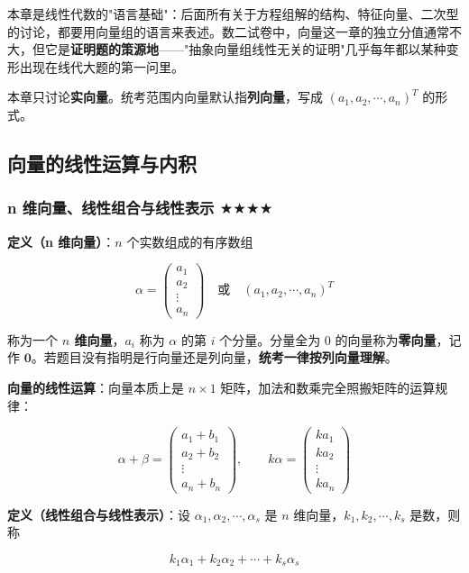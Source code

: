 \documentclass[11pt,openany,UTF8]{ctexbook}
\begin{document}
本章是线性代数的"语言基础"：后面所有关于方程组解的结构、特征向量、二次型的讨论，都要用向量组的语言来表述。数二试卷中，向量这一章的独立分值通常不大，但它是\textbf{证明题的策源地}——"抽象向量组线性无关的证明"几乎每年都以某种变形出现在线代大题的第一问里。

本章只讨论\textbf{实向量}。统考范围内向量默认指\textbf{列向量}，写成 $(a_1,a_2,\cdots,a_n)^T$ 的形式。

\subsection{向量的线性运算与内积}

\subsubsection{n 维向量、线性组合与线性表示 $\bigstar$$\bigstar$$\bigstar$$\bigstar$}

\textbf{定义（n 维向量）}：$n$ 个实数组成的有序数组

\[\alpha=\begin{pmatrix} a_1 \\ a_2 \\ \vdots \\ a_n \end{pmatrix} \quad \text{或} \quad (a_1,a_2,\cdots,a_n)^T\]

称为一个 \textbf{$n$ 维向量}，$a_i$ 称为 $\alpha$ 的第 $i$ 个分量。分量全为 $0$ 的向量称为\textbf{零向量}，记作 $\mathbf{0}$。若题目没有指明是行向量还是列向量，\textbf{统考一律按列向量理解}。

\textbf{向量的线性运算}：向量本质上是 $n\times 1$ 矩阵，加法和数乘完全照搬矩阵的运算规律：

\[\alpha+\beta=\begin{pmatrix} a_1+b_1 \\ a_2+b_2 \\ \vdots \\ a_n+b_n \end{pmatrix},\qquad k\alpha=\begin{pmatrix} ka_1 \\ ka_2 \\ \vdots \\ ka_n \end{pmatrix}\]

\textbf{定义（线性组合与线性表示）}：设 $\alpha_1,\alpha_2,\cdots,\alpha_s$ 是 $n$ 维向量，$k_1,k_2,\cdots,k_s$ 是数，则称

\[k_1\alpha_1+k_2\alpha_2+\cdots+k_s\alpha_s\]
\end{document}

